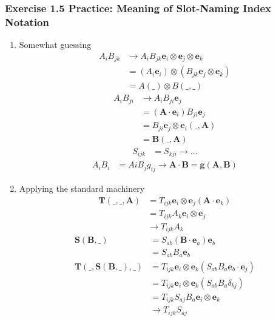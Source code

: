 \documentclass[10pt,a4paper]{book}
\theoremstyle{definition}
\begin{document}
\subsubsection{Exercise 1.5 Practice: Meaning of Slot-Naming Index Notation}
\begin{enumerate}[label=(\alph*)]
\item Somewhat guessing
\begin{align}
    A_iB_{jk}
    &\rightarrow A_iB_{jk}\mathbf{e}_i\otimes\mathbf{e}_j\otimes\mathbf{e}_k\\
    &= (A_i\mathbf{e}_i)\otimes (B_{jk}\mathbf{e}_j\otimes\mathbf{e}_k)\\
    &=A(\_)\otimes B(\_,\_)
\end{align}
\begin{align}
    A_iB_{ji}
    &\rightarrow A_iB_{ji}\mathbf{e}_j\\
    &=(\mathbf{A}\cdot\mathbf{e}_i)B_{ji}\mathbf{e}_j\\
    &=B_{ji}\mathbf{e}_j\otimes\mathbf{e}_i(\_,\mathbf{A})\\
    &=\mathbf{B}(\_,\mathbf{A})
\end{align}
\begin{align}
    S_{ijk}
    &=S_{kji}\rightarrow ...
\end{align}
\begin{align}
    A_iB_i&=AiB_jg_{ij}\rightarrow \mathbf{A}\cdot\mathbf{B}=\mathbf{g}(\mathbf{A},\mathbf{B})
\end{align}

\item Applying the standard machinery
\begin{align}
    \mathbf{T}(\_,\_,\mathbf{A})
    &=T_{ijk}\mathbf{e}_i\otimes\mathbf{e}_j(\mathbf{A}\cdot\mathbf{e}_k)\\
    &=T_{ijk}A_k\mathbf{e}_i\otimes\mathbf{e}_j\\
    &\rightarrow T_{ijk}A_k
\end{align}
\begin{align}
    \mathbf{S}(\mathbf{B},\_)
    &=S_{ab}(\mathbf{B}\cdot\mathbf{e}_a)\mathbf{e}_b\\
    &=S_{ab}B_a\mathbf{e}_b\\
    \mathbf{T}(\_,\mathbf{S}(\mathbf{B},\_),\_)
    &=T_{ijk}\mathbf{e}_i\otimes\mathbf{e}_k(S_{ab}B_a\mathbf{e}_b\cdot\mathbf{e}_j)\\
    &=T_{ijk}\mathbf{e}_i\otimes\mathbf{e}_k(S_{ab}B_a\delta_{bj})\\
    &=T_{ijk}S_{aj}B_a\mathbf{e}_i\otimes\mathbf{e}_k\\
    &\rightarrow T_{ijk}S_{aj}
\end{align}
\end{enumerate}
\end{document}
